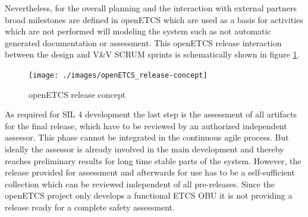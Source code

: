 Nevertheless, for the overall planning and the interaction with external partners broad milestones are defined in openETCS which are used as a basis for activities which are not performed will modeling the system such as not automatic generated documentation or assessment. This openETCS release interaction between the design and V\&V SCRUM sprints is schematically shown in figure \ref{fig:openETCSReleases}.

\begin{figure}[hbt]
\centering
\texttt{[image: ./images/openETCS\_release-concept]}
\caption{openETCS release concept}
\label{fig:openETCSReleases}
\end{figure}

As required for SIL 4 development the last step is the assessment of all artifacts for the final release, which have to be reviewed by an authorized independent assessor. This phase cannot be integrated in the continuous agile process. But ideally the assessor is already involved in the main development and thereby reaches preliminary results for long time stable parts of the system. However, the release provided for assessment and afterwards for use has to be a self-sufficient collection which can be reviewed independent of all pre-releases. Since the openETCS project only develops a functional ETCS OBU it is not providing a release ready for a complete safety assessment. 
 


%







